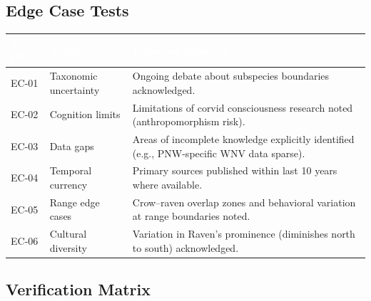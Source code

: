 \documentclass[11pt,letterpaper]{article}
\newcommand{\tableheader}[1]{\textbf{\sffamily\textcolor{white}{#1}}}
\begin{document}
\subsection{Edge Case Tests}

\begin{center}
\begin{tabularx}{\textwidth}{C{1.2cm}L{3.5cm}X}
\toprule
{}
\tableheader{Test ID} & \tableheader{Verifies} & \tableheader{Expected Behavior} \\
\midrule
EC-01 & Taxonomic uncertainty & Ongoing debate about subspecies boundaries acknowledged. \\
EC-02 & Cognition limits & Limitations of corvid consciousness research noted (anthropomorphism risk). \\
EC-03 & Data gaps & Areas of incomplete knowledge explicitly identified (e.g., PNW-specific WNV data sparse). \\
EC-04 & Temporal currency & Primary sources published within last 10 years where available. \\
EC-05 & Range edge cases & Crow--raven overlap zones and behavioral variation at range boundaries noted. \\
EC-06 & Cultural diversity & Variation in Raven's prominence (diminishes north to south) acknowledged. \\
\bottomrule
\end{tabularx}
\end{center}

\subsection{Verification Matrix}
\end{document}
